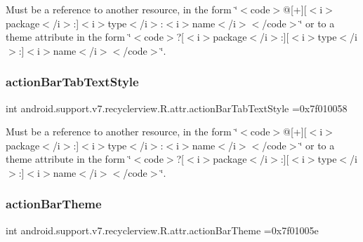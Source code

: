 Must be a reference to another resource, in the form \char`\"{}$<$code$>$@\mbox{[}+\mbox{]}\mbox{[}$<$i$>$package$<$/i$>$\+:\mbox{]}$<$i$>$type$<$/i$>$\+:$<$i$>$name$<$/i$>$$<$/code$>$\char`\"{} or to a theme attribute in the form \char`\"{}$<$code$>$?\mbox{[}$<$i$>$package$<$/i$>$\+:\mbox{]}\mbox{[}$<$i$>$type$<$/i$>$\+:\mbox{]}$<$i$>$name$<$/i$>$$<$/code$>$\char`\"{}. \mbox{\label{classandroid_1_1support_1_1v7_1_1recyclerview_1_1R_1_1attr_a94b13c0c5fc792bffd70f40261e2a185}} 
\subsubsection{\texorpdfstring{action\+Bar\+Tab\+Text\+Style}{actionBarTabTextStyle}}
{\footnotesize\ttfamily int android.\+support.\+v7.\+recyclerview.\+R.\+attr.\+action\+Bar\+Tab\+Text\+Style =0x7f010058\hspace{0.3cm}{\ttfamily [static]}}

Must be a reference to another resource, in the form \char`\"{}$<$code$>$@\mbox{[}+\mbox{]}\mbox{[}$<$i$>$package$<$/i$>$\+:\mbox{]}$<$i$>$type$<$/i$>$\+:$<$i$>$name$<$/i$>$$<$/code$>$\char`\"{} or to a theme attribute in the form \char`\"{}$<$code$>$?\mbox{[}$<$i$>$package$<$/i$>$\+:\mbox{]}\mbox{[}$<$i$>$type$<$/i$>$\+:\mbox{]}$<$i$>$name$<$/i$>$$<$/code$>$\char`\"{}. \mbox{\label{classandroid_1_1support_1_1v7_1_1recyclerview_1_1R_1_1attr_a5a457de53c19199da043726bc6a9e919}} 
\subsubsection{\texorpdfstring{action\+Bar\+Theme}{actionBarTheme}}
{\footnotesize\ttfamily int android.\+support.\+v7.\+recyclerview.\+R.\+attr.\+action\+Bar\+Theme =0x7f01005e\hspace{0.3cm}{\ttfamily [static]}}

